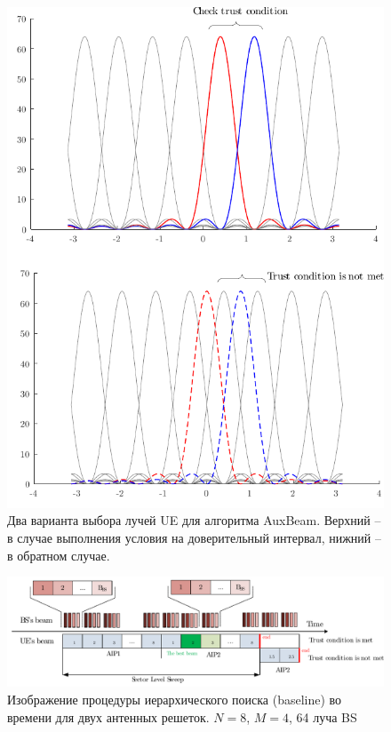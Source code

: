 \begin{figure}[ht]
    \centering
    \includegraphics{figs/fig4.16}
    \caption{Два варианта выбора лучей UE для алгоритма AuxBeam. Верхний -- в случае выполнения условия на доверительный интервал, нижний -- в обратном случае.}
    \label{<label>}
\end{figure}


\begin{figure}[ht]
    \centering
    \includegraphics[width=\linewidth]{figs/fig4.17}
    \caption{Изображение процедуры иерархического поиска (baseline) во времени для двух антенных решеток. $N=8$, $M=4$, 64 луча BS}
    \label{fig:4.9}
\end{figure}


